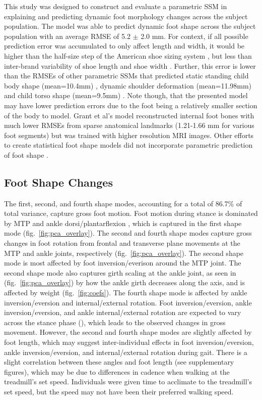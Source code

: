 \documentclass[defaultstyle,11pt]{comps}
\begin{document}
This study was designed to construct and evaluate a parametric SSM in explaining and predicting dynamic foot morphology changes across the subject population.
The model was able to predict dynamic foot shape across the subject population with an average RMSE of 5.2 \(\pm\) 2.0 mm. For context, if all possible prediction error was accumulated to only affect length and width, it would be higher than the half-size step of the American shoe sizing system \citep{Luximon2013}, but less than inter-brand variability of shoe length and shoe width \citep{Wannop2019}.
Further, this error is lower than the RMSEs of other parametric SSMs that predicted static standing child body shape (mean=10.4mm) \citep{Park2015a}, dynamic shoulder deformation (mean=11.98mm) \citep{Kim2016} and child torso shape (mean=9.5mm) \citep{Park2017}. Note though, that the presented model may have lower prediction errors due to the foot being a relatively smaller section of the body to model. Grant et al's model reconstructed internal foot bones with much lower RMSEs from sparse anatomical landmarks (1.21-1.66 mm for various foot segments) \citep{Grant2020} but was trained with higher resolution MRI images. Other efforts to create statistical foot shape models did not incorporate parametric prediction of foot shape \citep{Conrad2019, Stankovic2020}.

\hypertarget{foot-shape-changes}{%
\subsection{Foot Shape Changes}\label{foot-shape-changes}}

The first, second, and fourth shape modes, accounting for a total of 86.7\% of total variance, capture gross foot motion.
Foot motion during stance is dominated by MTP and ankle dorsi/plantarflexion \citep{Leardini2007}, which is captured in the first shape mode (fig.~\ref{fig:pca_overlay}).
The second and fourth shape modes capture gross changes in foot rotation from frontal and transverse plane movements at the MTP and ankle joints, respectively (fig.~\ref{fig:pca_overlay}).
The second shape mode is most affected by foot inversion/everison around the MTP joint.
The second shape mode also captures girth scaling at the ankle joint, as seen in (fig.~\ref{fig:pca_overlay}) by how the ankle girth decreases along the axis, and is affected by weight (fig.~\ref{fig:coefs}).
The fourth shape mode is affected by ankle inversion/eversion and internal/external rotation.
Foot inversion/eversion, ankle inversion/eversion, and ankle internal/external rotation are expected to vary across the stance phase (\citep{Leardini2007}), which leads to the observed changes in gross movement.
However, the second and fourth shape modes are slightly affected by foot length, which may suggest inter-individual effects in foot inversion/eversion, ankle inversion/eversion, and internal/external rotation during gait.
There is a slight correlation between these angles and foot length (see supplementary figures), which may be due to differences in cadence when walking at the treadmill's set speed.
Individuals were given time to acclimate to the treadmill's set speed, but the speed may not have been their preferred walking speed.
\end{document}
